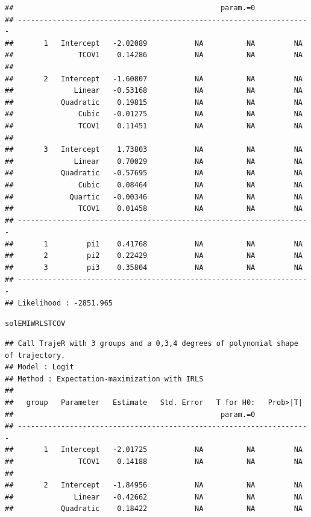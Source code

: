 \documentclass{article}\usepackage[]{graphicx}\usepackage[]{color}
\makeatletter
\newcommand{\hlstd}[1]{\textcolor[rgb]{0.345,0.345,0.345}{#1}}%
\newenvironment{kframe}{%
 \def\at@end@of@kframe{}%
 \ifinner\ifhmode%
  \def\at@end@of@kframe{\end{minipage}}%
  \begin{minipage}{\columnwidth}%
 \fi\fi%
 \def\FrameCommand##1{\hskip\@totalleftmargin \hskip-\fboxsep
 \colorbox{shadecolor}{##1}\hskip-\fboxsep
     \hskip-\linewidth \hskip-\@totalleftmargin \hskip\columnwidth}%
 \MakeFramed {\advance\hsize-\width
   \@totalleftmargin\z@ \linewidth\hsize
   \@setminipage}}%
 {\par\unskip\endMakeFramed%
 \at@end@of@kframe}
\newenvironment{knitrout}{}{} %
\makeatother
\begin{document}
\begin{knitrout}
\begin{kframe}
\begin{verbatim}
##                                                param.=0             
## --------------------------------------------------------------------
##       1   Intercept   -2.02089           NA          NA         NA  
##               TCOV1    0.14286           NA          NA         NA  
##                                                                     
##       2   Intercept   -1.60807           NA          NA         NA  
##              Linear   -0.53168           NA          NA         NA  
##           Quadratic    0.19815           NA          NA         NA  
##               Cubic   -0.01275           NA          NA         NA  
##               TCOV1    0.11451           NA          NA         NA  
##                                                                     
##       3   Intercept    1.73803           NA          NA         NA  
##              Linear    0.70029           NA          NA         NA  
##           Quadratic   -0.57695           NA          NA         NA  
##               Cubic    0.08464           NA          NA         NA  
##             Quartic   -0.00346           NA          NA         NA  
##               TCOV1    0.01458           NA          NA         NA  
## --------------------------------------------------------------------
##       1         pi1    0.41768           NA          NA         NA  
##       2         pi2    0.22429           NA          NA         NA  
##       3         pi3    0.35804           NA          NA         NA  
## --------------------------------------------------------------------
## Likelihood : -2851.965
\end{verbatim}
\begin{alltt}
\hlstd{solEMIWRLSTCOV}
\end{alltt}
\begin{verbatim}
## Call TrajeR with 3 groups and a 0,3,4 degrees of polynomial shape of trajectory.
## Model : Logit
## Method : Expectation-maximization with IRLS
##  
##   group   Parameter   Estimate   Std. Error   T for H0:   Prob>|T|  
##                                                param.=0             
## --------------------------------------------------------------------
##       1   Intercept   -2.01725           NA          NA         NA  
##               TCOV1    0.14188           NA          NA         NA  
##                                                                     
##       2   Intercept   -1.84956           NA          NA         NA  
##              Linear   -0.42662           NA          NA         NA  
##           Quadratic    0.18422           NA          NA         NA  

\end{verbatim}
\end{kframe}
\end{knitrout}
\end{document}
